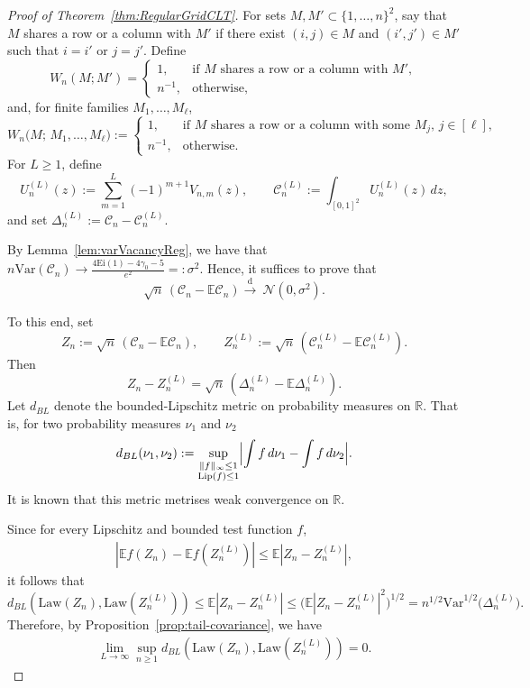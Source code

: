 \documentclass[11pt]{article}
\newcommand{\var}{\mathrm{Var}}
\newcommand{\dto}{\xrightarrow{\,\mathrm{d}\,} }
\begin{document}
\begin{proof}[Proof of Theorem~\ref{thm:RegularGridCLT}]
For sets $M,M'\subset\{1,\dots,n\}^2$, say that $M$ shares a row or a column with $M'$ if there exist $(i,j)\in M$ and $(i',j')\in M'$ such that $i=i'$ or $j=j'$. Define
\[
W_n(M;M')=
\begin{cases}
1,&\text{if $M$ shares a row or a column with $M'$},\\
n^{-1},&\text{otherwise},
\end{cases}
\]
and, for finite families $M_1,\dots,M_\ell$,
\[
W_n\bigl(M;\,M_1,\dots,M_\ell\bigr):=
\begin{cases}
1,&\text{if $M$ shares a row or a column with some $M_j$, $j\in[\ell]$},\\
n^{-1},&\text{otherwise}.
\end{cases}
\]
For $L\ge1$, define
\[
U_n^{(L)}(z):=\sum_{m=1}^{L}(-1)^{m+1}V_{n,m}(z),\qquad
\mathscr{C}_n^{(L)}:=\int_{[0,1]^2}U_n^{(L)}(z)\,dz,
\]
and set $\Delta_n^{(L)}:=\mathscr{C}_n-\mathscr{C}_n^{(L)}$.

By Lemma~\ref{lem:varVacancyReg}, we have that $n\var(\mathscr{C}_n) \to \frac{4\mathrm{Ei}(1)-4\gamma_0-5}{e^2} =: \sigma^2$. Hence, it suffices to prove that 
\begin{equation}
\label{Eq:CLT_Cn}
\sqrt n\,(\mathscr{C}_n-\mathbb{E} \mathscr{C}_n) \dto \ \mathcal{N}(0,\sigma^2).
\end{equation}

To this end, set
\[
Z_n := \sqrt n \,(\mathscr{C}_n-\mathbb{E} \mathscr{C}_n),
\qquad
Z_n^{(L)} := \sqrt n \,(\mathscr{C}_n^{(L)}-\mathbb{E} \mathscr{C}_n^{(L)}).
\]
Then
\[
Z_n-Z_n^{(L)}=\sqrt n\,(\Delta_n^{(L)}-\mathbb E\Delta_n^{(L)}).
\]
Let $d_{BL}$ denote the bounded-Lipschitz metric on probability measures on $\mathbb R$. That is, for two probability measures $\nu_1$ and $\nu_2$
\[
d_{BL}(\nu_1,\nu_2)
:=
\sup_{\substack{\|f\|_\infty\le1\\ \mathrm{Lip}(f)\le1}}
\Bigl|\int f\,d\nu_1-\int f\,d\nu_2\Bigr|.
\] 
It is known that this metric metrises weak convergence on $\mathbb R$. 

Since for every Lipschitz and bounded test function $f$,
\begin{align*}
|\mathbb{E}f(Z_n) - \mathbb{E}f(Z_n^{(L)})| \leq \mathbb{E}|Z_n - Z_n^{(L)}|, 
\end{align*}
it follows that
\[
d_{BL}(\mathrm{Law}(Z_n), \mathrm{Law}(Z_n^{(L)})) \leq \mathbb{E}|Z_n - Z_n^{(L)}| \leq \bigl(\mathbb{E}|Z_n - Z_n^{(L)}|^2\bigr)^{1/2} = n^{1/2} \mathrm{Var}^{1/2} \bigl(\Delta_n^{(L)} \bigr).
\]
Therefore, by Proposition~\ref{prop:tail-covariance}, we have 
\begin{align}
\lim_{L \to \infty}\sup_{n \geq 1} d_{BL}(\mathrm{Law}(Z_n), \mathrm{Law}(Z_n^{(L)}))  = 0. \label{eq:BL1}
\end{align}


\end{proof}
\end{document}
